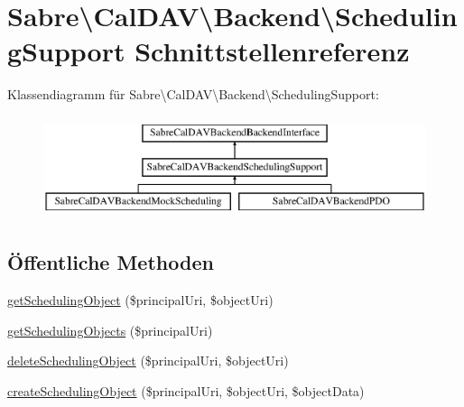 \hypertarget{interface_sabre_1_1_cal_d_a_v_1_1_backend_1_1_scheduling_support}{}\section{Sabre\textbackslash{}Cal\+D\+AV\textbackslash{}Backend\textbackslash{}Scheduling\+Support Schnittstellenreferenz}
\label{interface_sabre_1_1_cal_d_a_v_1_1_backend_1_1_scheduling_support}
Klassendiagramm für Sabre\textbackslash{}Cal\+D\+AV\textbackslash{}Backend\textbackslash{}Scheduling\+Support\+:\begin{figure}[H]
\begin{center}
\leavevmode
\includegraphics[height=3.000000cm]{interface_sabre_1_1_cal_d_a_v_1_1_backend_1_1_scheduling_support}
\end{center}
\end{figure}
\subsection*{Öffentliche Methoden}
\begin{DoxyCompactItemize}
\item 
\mbox{\hyperlink{interface_sabre_1_1_cal_d_a_v_1_1_backend_1_1_scheduling_support_a01af6a746c7ed902a83c7eda56226519}{get\+Scheduling\+Object}} (\$principal\+Uri, \$object\+Uri)
\item 
\mbox{\hyperlink{interface_sabre_1_1_cal_d_a_v_1_1_backend_1_1_scheduling_support_afdf40c6b8b703d1b2ffccb74106b4457}{get\+Scheduling\+Objects}} (\$principal\+Uri)
\item 
\mbox{\hyperlink{interface_sabre_1_1_cal_d_a_v_1_1_backend_1_1_scheduling_support_aee5854c2fa93f6a4f29430e6fe68229b}{delete\+Scheduling\+Object}} (\$principal\+Uri, \$object\+Uri)
\item 
\mbox{\hyperlink{interface_sabre_1_1_cal_d_a_v_1_1_backend_1_1_scheduling_support_a35f6df6ce36abacd013a5f0a26b3ae8d}{create\+Scheduling\+Object}} (\$principal\+Uri, \$object\+Uri, \$object\+Data)
\end{DoxyCompactItemize}


